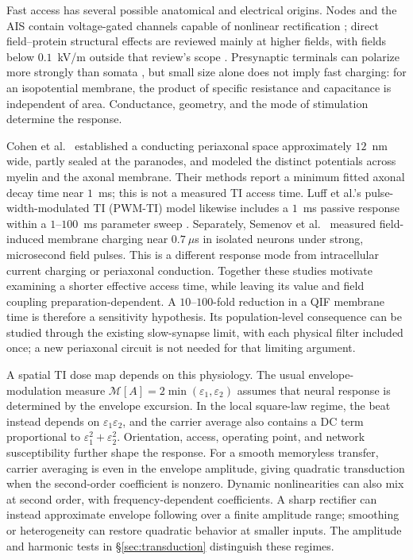 \documentclass[11pt,a4paper]{article}
\providecommand{\DIFaddtex}[1]{{\protect\color{blue} \sf #1}} %
\providecommand{\DIFaddbegin}{} %
\providecommand{\DIFaddend}{} %
\providecommand{\DIFadd}[1]{\texorpdfstring{\DIFaddtex{#1}}{#1}} %
\begin{document}
Fast access has several possible anatomical and electrical origins. Nodes and the
AIS contain voltage-gated channels capable of nonlinear rectification
\cite{mirzakhalili2020,wang2023}\DIFaddbegin \DIFadd{; direct field--protein structural effects are
reviewed mainly at higher fields, with fields below $0.1$~kV/m outside that
review's scope \cite{cifra2026}}\DIFaddend . Presynaptic terminals can polarize more strongly
than somata \cite{rahman2013,aberra2023,chakraborty2018}, but small size alone does
not imply fast charging: for an isopotential membrane, the product of specific
resistance and capacitance is independent of area. Conductance, geometry, and the
mode of stimulation determine the response.

Cohen et al.\ \cite{cohen2020periaxonal} established a conducting periaxonal space
approximately $12$~nm wide, partly sealed at the paranodes, and modeled the distinct
potentials across myelin and the axonal membrane. Their methods report a minimum
fitted axonal decay time near $1$~ms; this is not a measured TI access time.
Luff et al.'s pulse-width-modulated TI (PWM-TI) model likewise includes a $1$~ms passive response within a
$1$--$100$~ms parameter sweep \cite{luff2024}. Separately, Semenov et al.\
\cite{semenov2025} measured field-induced membrane charging near $0.7~\mu$s in
isolated neurons under strong, microsecond field pulses. This is a different
response mode from intracellular current charging or periaxonal conduction.
Together these studies motivate examining a shorter effective access time, while
leaving its value and field coupling preparation-dependent. A $10$--$100$-fold
reduction in a QIF membrane time is therefore a sensitivity hypothesis. Its
population-level consequence can be studied through the existing slow-synapse
limit, with each physical filter included once; a new periaxonal circuit is not
needed for that limiting argument.

A spatial TI dose map depends on this physiology. The usual envelope-modulation
measure $\mathcal M[A]=2\min(\varepsilon_1,\varepsilon_2)$ assumes that neural
response is determined by the envelope excursion. In the local square-law regime,
the beat instead depends on $\varepsilon_1\varepsilon_2$, and the carrier average
also contains a DC term proportional to $\varepsilon_1^2+\varepsilon_2^2$.
Orientation, access, operating point, and network susceptibility further shape
the response. For a smooth memoryless transfer, carrier averaging is even in the
envelope amplitude, giving quadratic transduction when the second-order coefficient
is nonzero. Dynamic nonlinearities can also mix at second order, with
frequency-dependent coefficients. A sharp rectifier can instead approximate
envelope following over a finite amplitude range; smoothing or heterogeneity
can restore quadratic behavior at smaller inputs. The amplitude and harmonic
tests in \S\ref{sec:transduction} distinguish these regimes.
\end{document}
